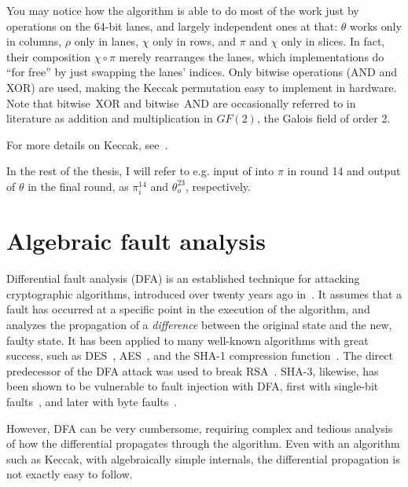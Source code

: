 \documentclass[times, utf8, diplomski]{fer}
\begin{document}
You may notice how the algorithm is able to do most of the work just by operations
on the 64-bit lanes, and largely independent ones at that:
$\theta$ works only in columns, $\rho$ only in lanes, $\chi$ only in rows, and
$\pi$ and $\chi$ only in slices. In fact, their composition $\chi \circ \pi$
merely rearranges the lanes, which implementations do ``for free'' by just
swapping the lanes' indices. Only bitwise operations (AND and XOR) are used,
making the Keccak permutation easy to implement in hardware.
Note that bitwise~XOR and bitwise~AND are occasionally referred to in literature
as addition and multiplication in $GF(2)$, the Galois field of order 2.

For more details on Keccak, see~\cite{keccak_reference}.

In the rest of the thesis, I will refer to e.g. input of into $\pi$ in round 14
and output of $\theta$ in the final round, as $\pi^{14}_i$ and $\theta^{23}_o$,
respectively.


\section{Algebraic fault analysis}
Differential fault analysis (DFA) is an established technique for attacking
cryptographic algorithms, introduced over twenty years ago in~\cite{DFA_DES}.
It assumes that a fault has occurred at a specific point in the execution of the
algorithm, and analyzes the propagation of a \emph{difference} between the
original state and the new, faulty state. It has been applied to many well-known
algorithms with great success, such as DES~\cite{DFA_DES}, AES~\cite{DFA_AES, DFA_AES_single-fault},
and the SHA-1 compression function~\cite{DFA_SHA-1_compression}. The direct
predecessor of the DFA attack was used to break RSA~\cite{boneh-demillo-lipton_RSA}.
SHA-3, likewise, has been shown to be vulnerable to fault injection with DFA,
first with single-bit faults~\cite{DFA_SHA-3_single-bit}, and later with byte
faults~\cite{luo2017relaxed}.

However, DFA can be very cumbersome, requiring complex and tedious analysis of
how the differential propagates through the algorithm. Even with an algorithm
such as Keccak, with algebraically simple internals, the differential propagation
is not exactly easy to follow.\footnotemark

\end{document}

